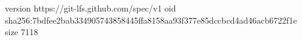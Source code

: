 version https://git-lfs.github.com/spec/v1
oid sha256:7bdfee2bab334905743858445ffa8158aa93f377e85dccbcd4ad46acb6722f1e
size 7118
